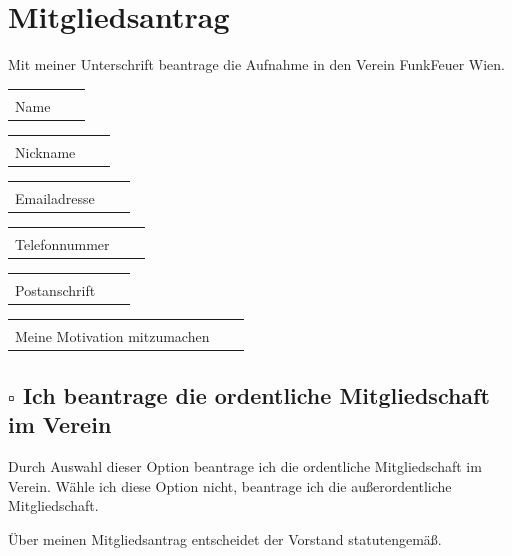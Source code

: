 \documentclass[parskip=half]{scrreprt}
\begin{document}
\section*{\\Mitgliedsantrag}
\thispagestyle{fancy}

Mit meiner Unterschrift beantrage die Aufnahme in den Verein FunkFeuer
Wien.

\vspace{0.5 cm}
\begin{tabular}{p{7cm}p{.5cm}l}
\dotfill \\
Name
\end{tabular}
\hfill
\begin{tabular}{p{7cm}p{.5cm}l}
\dotfill \\
Nickname
\end{tabular}

\vspace{0.5cm}
\begin{tabular}{p{7cm}p{.5cm}l}
\dotfill \\
Emailadresse
\end{tabular}
\hfill
\begin{tabular}{p{7cm}p{.5cm}l}
\dotfill \\
Telefonnummer
\end{tabular}

\vspace{0.5cm}
\begin{tabular}{p{7cm}p{.5cm}l}
\dotfill \\
Postanschrift
\end{tabular}
\hfill
\begin{tabular}{p{7cm}p{.5cm}l}
\dotfill \\
Meine Motivation mitzumachen
\end{tabular}



\subsection*{$\square$ Ich beantrage die ordentliche Mitgliedschaft im Verein}
Durch Auswahl dieser Option beantrage ich die ordentliche
Mitgliedschaft im Verein.
Wähle ich diese Option nicht, beantrage ich die außerordentliche
Mitgliedschaft.

Über meinen Mitgliedsantrag entscheidet der Vorstand statutengemäß.
\end{document}
